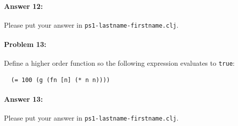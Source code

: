 \documentclass[10pt]{article}
\newcommand{\required}[1]{{\color{blue}{#1}}}
\newcommand{\PSnum}{1}
\begin{document}
\paragraph{Answer 12:} Please put your answer in
\texttt{ps\PSnum-lastname-firstname.clj}.

\noindent\hrulefill%

\paragraph{Problem 13:} Define a higher order function \required{\texttt{g}} so
the following expression evaluates to \texttt{true}:
\begin{lstlisting}
  (= 100 (g (fn [n] (* n n))))
\end{lstlisting}

\paragraph{Answer 13:} Please put your answer in
\texttt{ps\PSnum-lastname-firstname.clj}.

\noindent\hrulefill%
\end{document}

